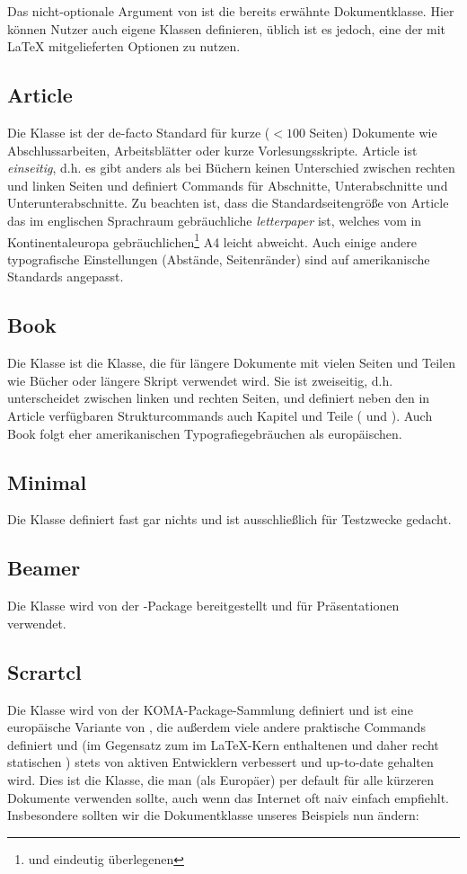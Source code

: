 Das nicht-optionale Argument von  ist die bereits erwähnte Dokumentklasse.
Hier können Nutzer auch eigene Klassen definieren, üblich ist es jedoch, eine der mit \LaTeX{} mitgelieferten Optionen zu nutzen.

\subsection{Article}
Die Klasse  ist der de-facto Standard für kurze ($<100$ Seiten) Dokumente wie Abschlussarbeiten, Arbeitsblätter oder kurze Vorlesungsskripte.
Article ist \emph{einseitig}, d.h. es gibt anders als bei Büchern keinen Unterschied zwischen rechten und linken Seiten und definiert Commands für Abschnitte, Unterabschnitte und Unterunterabschnitte.
Zu beachten ist, dass die Standardseitengröße von Article das im englischen Sprachraum gebräuchliche \emph{letterpaper} ist, welches vom in Kontinentaleuropa gebräuchlichen\footnote{und eindeutig überlegenen} A4 leicht abweicht.
Auch einige andere typografische Einstellungen (Abstände, Seitenränder) sind auf amerikanische Standards angepasst. 

\subsection{Book}
Die Klasse  ist die Klasse, die für längere Dokumente mit vielen Seiten und Teilen wie Bücher oder längere Skript verwendet wird.
Sie ist zweiseitig, d.h. unterscheidet zwischen linken und rechten Seiten, und definiert neben den in Article verfügbaren Strukturcommands auch Kapitel und Teile ( und ).
Auch Book folgt eher amerikanischen Typografiegebräuchen als europäischen.

\subsection{Minimal}
Die Klasse  definiert fast gar nichts und ist ausschließlich für Testzwecke gedacht.

\subsection{Beamer}
Die Klasse  wird von der -Package bereitgestellt und für Präsentationen verwendet.

\subsection{Scrartcl}
Die Klasse  wird von der KOMA-Package-Sammlung definiert und ist eine europäische Variante von , die außerdem viele andere praktische Commands definiert und (im Gegensatz zum im \LaTeX{}-Kern enthaltenen und daher recht statischen ) stets von aktiven Entwicklern verbessert und up-to-date gehalten wird.
Dies ist die Klasse, die man (als Europäer) per default für alle kürzeren Dokumente verwenden sollte, auch wenn das Internet oft naiv einfach  empfiehlt.
Insbesondere sollten wir die Dokumentklasse unseres Beispiels nun ändern:

